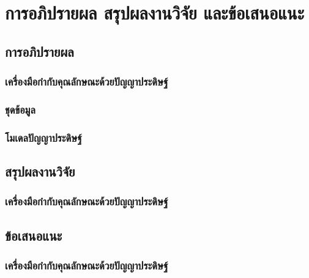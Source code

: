
\chapter{การอภิปรายผล สรุปผลงานวิจัย และข้อเสนอแนะ}

\section{การอภิปรายผล}
\subsection{เครื่องมือกำกับคุณลักษณะด้วยปัญญาประดิษฐ์}


\subsection{ชุดข้อมูล}

\subsection{โมเดลปัญญาประดิษฐ์}

\section{สรุปผลงานวิจัย}
\subsection{เครื่องมือกำกับคุณลักษณะด้วยปัญญาประดิษฐ์}


\section{ข้อเสนอแนะ}
\subsection{เครื่องมือกำกับคุณลักษณะด้วยปัญญาประดิษฐ์}
